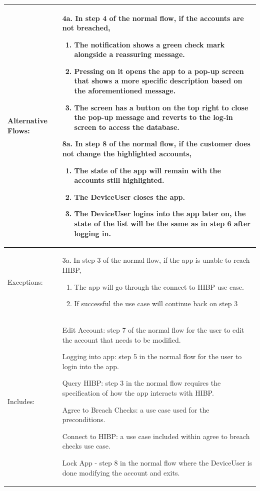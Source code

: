 \documentclass[stu]{apa7}
\newcommand{\nextitemblank}{\par\hspace*{\labelsep}\hspace*{\labelsep}}
\begin{document}
{{{\begin{xltabular}{\textwidth}{|l|X|}
  Alternative Flows: &
                       \nextitemblank 4a. In step 4 of the normal flow, if the accounts are not breached,
                       \begin{enumerate}
                         \item The notification shows a green check mark alongside a reassuring message.
                         \item Pressing on it opens the app to a pop-up screen that shows a more specific description based on the aforementioned message.
                         \item The screen has a button on the top right to close the pop-up message and reverts to the log-in screen to access the database.
                       \end{enumerate}
                       \nextitemblank  8a. In step 8 of the normal flow, if the customer does not change the highlighted accounts,
                       \begin{enumerate}
                         \item The state of the app will remain with the accounts still highlighted.
                         \item The DeviceUser closes the app.
                         \item The DeviceUser logins into the app later on, the state of the list will be the same as in step 6 after logging in.
                       \end{enumerate} \\ \hline

  Exceptions: &
                3a. In step 3 of the normal flow, if the app is unable to reach HIBP,
                \begin{enumerate}
                  \item The app will go through the connect to HIBP use case.
                  \item If successful the use case will continue back on step 3
                \end{enumerate} \\ \hline

  Includes: & \nextitemblank Edit Account: step 7 of the normal flow for the user to edit the account that needs to be modified.
              \nextitemblank Logging into app: step 5 in the normal flow for the user to login into the app.
              \nextitemblank Query HIBP: step 3 in the normal flow requires the specification of how the app interacts with HIBP.
              \nextitemblank Agree to Breach Checks: a use case used for the preconditions.
              \nextitemblank Connect to HIBP: a use case included within agree to breach checks use case.
              \nextitemblank Lock App - step 8 in the normal flow where the DeviceUser is done modifying the account and exits. \\ \hline


\end{xltabular}}}}
\end{document}
